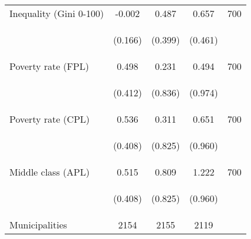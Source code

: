 \begin{tabular}{lcccc}
Inequality (Gini 0-100)     &  -0.002    &    0.487   &     0.657  &  700  \\

\vspace{4pt} &  \begin{footnotesize}(0.166)\end{footnotesize}   &
			    \begin{footnotesize}(0.399)\end{footnotesize}   &
			    \begin{footnotesize}(0.461)\end{footnotesize}   &
			     \\


Poverty rate (FPL)     &  0.498    &    0.231   &     0.494  &  700 \\

\vspace{4pt} &  \begin{footnotesize}(0.412)\end{footnotesize}   &
			    \begin{footnotesize}(0.836)\end{footnotesize}   &
			    \begin{footnotesize}(0.974)\end{footnotesize}   &
			     \\
 
Poverty rate (CPL)  &  0.536    &    0.311   &     0.651  &  700  \\

\vspace{4pt} &  \begin{footnotesize}(0.408)\end{footnotesize}   &
			    \begin{footnotesize}(0.825)\end{footnotesize}   &
			    \begin{footnotesize}(0.960)\end{footnotesize}   &
			     \\

Middle class (APL)  &  0.515    &   0.809    &     1.222  &  700  \\ 

\vspace{4pt} &  \begin{footnotesize}(0.408)\end{footnotesize}   &
			    \begin{footnotesize}(0.825)\end{footnotesize}   &
			    \begin{footnotesize}(0.960)\end{footnotesize}   &
			     \\

Municipalities   &   2154   &    2155     &  2119    \\
\hline	


\end{tabular}%
